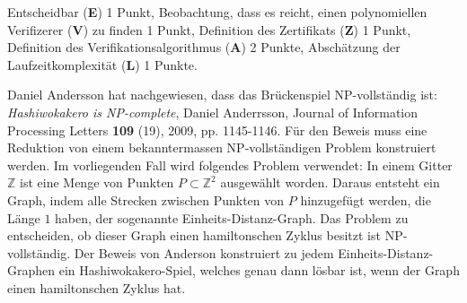\begin{bewertung}
Entscheidbar ({\bf E}) 1 Punkt,
Beobachtung, dass es reicht, einen polynomiellen Verifizerer ({\bf V})
zu finden 1 Punkt,
Definition des Zertifikats ({\bf Z}) 1 Punkt,
Definition des Verifikationsalgorithmus ({\bf A}) 2 Punkte,
Abschätzung der Laufzeitkomplexität ({\bf L}) 1 Punkte.
\end{bewertung}

\begin{diskussion}
Daniel Andersson hat nachgewiesen, dass das Brückenspiel
NP-vollständig ist: {\it Hashiwokakero is NP-complete},
Daniel Anderrsson, Journal of Information Processing Letters {\bf 109} (19),
2009, pp. 1145-1146.
Für den Beweis muss eine Reduktion von einem bekanntermassen
NP-vollständigen Problem konstruiert werden.
Im vorliegenden Fall wird folgendes Problem verwendet:
In einem Gitter $\mathbb Z$ ist eine Menge von Punkten $P\subset \mathbb Z^2$
ausgewählt worden.
Daraus entsteht ein Graph, indem alle Strecken zwischen Punkten von $P$
hinzugefügt werden, die Länge $1$ haben,
der sogenannte Einheits-Distanz-Graph.
Das Problem zu entscheiden,
ob dieser Graph einen hamiltonschen Zyklus besitzt ist NP-vollständig.
Der Beweis von Anderson konstruiert zu jedem Einheits-Distanz-Graphen
ein Hashiwokakero-Spiel, welches genau dann lösbar ist, wenn der
Graph einen hamiltonschen Zyklus hat.
\end{diskussion}

